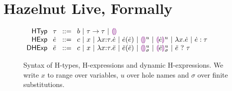 
\clearpage
\newcommand{\calculusSec}{Hazelnut Live, Formally}
\section{\protect\calculusSec}
\label{sec:calculus}

\begin{figure}[h]
$\arraycolsep=4pt\begin{array}{rllllll}
\mathsf{HTyp} & \htau & ::= &
  b ~\vert~
  \tarr{\htau}{\htau} ~\vert~
  \tehole\\
\mathsf{HExp} & \hexp & ::= &
  c ~\vert~ 
  x ~\vert~
  \halam{x}{\htau}{\hexp} ~\vert~
  \hap{\hexp}{\hexp} ~\vert~
  \hehole{u} ~\vert~
  \hhole{\hexp}{u} ~\vert~
  {\hlam{x}{\hexp}} ~\vert~
  \hexp : \htau\\
 \mathsf{DHExp} & \dexp  & ::= &
  c ~\vert~
  x ~\vert~
  {\halam{x}{\htau}{\dexp}} ~\vert~
  \hap{\dexp}{\dexp} ~\vert~
  \dehole{\mvar}{\subst} ~\vert~
  \dhole{\dexp}{\mvar}{\subst} ~\vert~
  \dcast{\dexp}{\htau}\\
\end{array}$
\caption{Syntax of H-types, H-expressions and dynamic H-expressions. We write $x$ to range over variables, $u$ over hole names and $\sigma$ over finite substitutions.}
\label{fig:HTyp}
\label{fig:HExp}
\end{figure}


